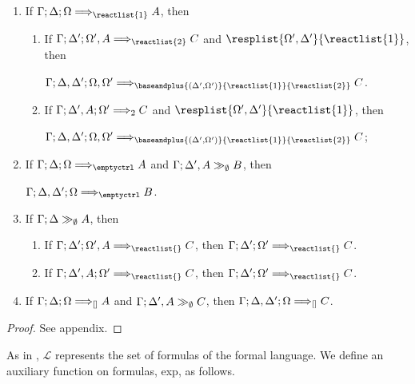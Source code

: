 \begin{theorem}\label{focusedcutelim}
  \begin{enumerate}
  \item If $\ztriseq{\Gamma}{\Delta}{\Omega}{\reactlist{1}}{A}$, then
    \begin{enumerate}
    \item If $\ztriseq{\Gamma}{\Delta'}{\Omega', A}{\reactlist{2}}{C}$ and
      $\resplist{\Omega', \Delta'}{\reactlist{1}}$, then

      $\ztriseq{\Gamma}{\Delta, \Delta'}{\Omega, \Omega'}{
        \baseandplus{(\Delta',\Omega')}{\reactlist{1}}{\reactlist{2}}}{C}$.
    \item If $\Gamma; \Delta', A; \Omega' \Longrightarrow_{2} C$ and
      $\resplist{\Omega', \Delta'}{\reactlist{1}}$, then

      $\ztriseq{\Gamma}{\Delta, \Delta'}{\Omega, \Omega'}{
        \baseandplus{(\Delta', \Omega')}{\reactlist{1}}{\reactlist{2}}}{C}$;
    \end{enumerate}

  \item If $\ztriseq{\Gamma}{\Delta}{\Omega}{\emptyctrl}{A}$ and
    $\Gamma; \Delta', A \gg_{\emptyset} B$, then

    $\ztriseq{\Gamma}{\Delta, \Delta'}{\Omega}{\emptyctrl}{B}$.

  \item If $\Gamma; \Delta \gg_{\emptyset} A$, then
    \begin{enumerate}
    \item If $\ztriseq{\Gamma}{\Delta'}{\Omega', A}{\reactlist{}}{C}$, then
      $\ztriseq{\Gamma}{\Delta'}{\Omega'}{\reactlist{}}{C}$.
    \item If $\ztriseq{\Gamma}{\Delta', A}{\Omega'}{\reactlist{}}{C}$, then
      $\ztriseq{\Gamma}{\Delta'}{\Omega'}{\reactlist{}}{C}$.
    \end{enumerate}
  \item If $\Gamma; \Delta; \Omega \Longrightarrow_{[]} A$ and
    $\Gamma; \Delta', A \gg_{\emptyset} C$, then
    $\Gamma; \Delta, \Delta'; \Omega \Longrightarrow_{[]} C$.
  \end{enumerate}
\end{theorem}
\begin{proof}
  See appendix.
\end{proof}

As in \cite{adding-logic}, $\mathcal{L}$ represents the set of formulas of the
formal language. We define an auxiliary function on formulas, \textsf{exp}, as
follows.

